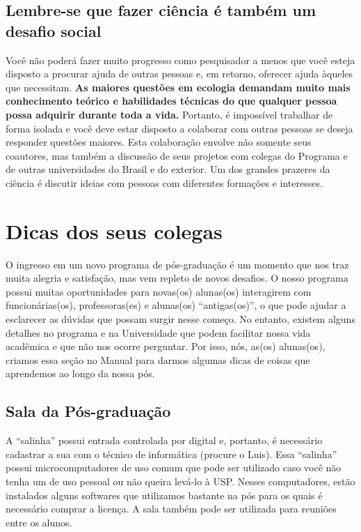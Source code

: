 \documentclass[twoside a4paper 12pt]{report}
\begin{document}
\section{Lembre-se que fazer ciência é também um desafio social}

Você não poderá fazer muito progresso como pesquisador a menos que você esteja disposto a procurar ajuda de outras pessoas e, em retorno, oferecer ajuda àqueles que necessitam. \textbf{As maiores questões em ecologia demandam muito mais conhecimento teórico e habilidades técnicas do que qualquer pessoa possa adquirir durante toda a vida.} Portanto, é impossível trabalhar de forma isolada e você deve estar disposto a colaborar com outras pessoas se deseja responder questões maiores. Esta colaboração envolve não somente seus coautores, mas também a discussão de seus projetos com colegas do Programa e de outras universidades do Brasil e do exterior. Um dos grandes prazeres da ciência é discutir ideias com pessoas com diferentes formações e interesses.


\chapter[Dicas dos alunos]{Dicas dos seus colegas}

O ingresso em um novo programa de pós-graduação é um momento que nos traz muita alegria e satisfação, mas vem repleto de novos desafios. O nosso programa possui muitas oportunidades para novas(os) alunas(os) interagirem com funcionárias(os), professoras(es) e alunas(os) ``antigas(os)'', o que pode ajudar a esclarecer as dúvidas que possam surgir nesse começo. No entanto, existem alguns detalhes no programa e na Universidade que podem facilitar nossa vida acadêmica e que não nos ocorre perguntar. Por isso, nós, as(os) alunas(os), criamos essa seção no Manual para darmos algumas dicas de coisas que aprendemos ao longo da nossa pós.


\section{Sala da Pós-graduação}\label{sala-da-posgraduaucao}

A ``salinha'' possui entrada controlada por digital e, portanto, é necessário cadastrar a sua com o técnico de informática (procure o Luis). Essa ``salinha'' possui microcomputadores de uso comum que pode ser utilizado caso você não tenha um de uso pessoal ou não queira levá-lo à USP. Nesses computadores, estão instalados alguns softwares que utilizamos bastante na pós para os quais é necessário comprar a licença. A sala também pode ser utilizada para reuniões entre os alunos. 
\end{document}

